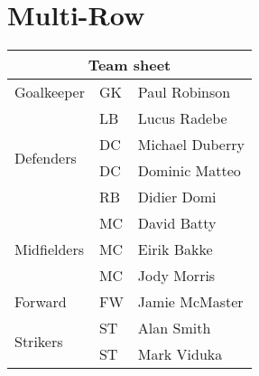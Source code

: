 \documentclass{article}
\begin{document}
\section{Multi-Row}
\begin{tabular}{|l|l|l|}
\hline
\multicolumn{3}{|c|}{Team sheet} \\
\hline
Goalkeeper & GK & Paul Robinson \\ \hline
\multirow{4}{*}{Defenders} & LB & Lucus Radebe \\
 & DC & Michael Duberry \\
 & DC & Dominic Matteo \\
 & RB & Didier Domi \\ \hline
\multirow{3}{*}{Midfielders} & MC & David Batty \\
 & MC & Eirik Bakke \\
 & MC & Jody Morris \\ \hline
Forward & FW & Jamie McMaster \\ \hline
\multirow{2}{*}{Strikers} & ST & Alan Smith \\
 & ST & Mark Viduka \\
\hline
\end{tabular}
\end{document}
